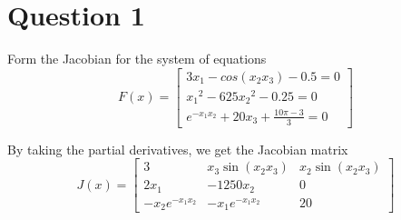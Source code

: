 \section{Question 1}

\begin{question}
    Form the Jacobian for the system of equations 
    \begin{equation}
        F(x) = \left[\begin{matrix}3x_1 − cos(x_2x_3) − 0.5 = 0\\  {x_1}^2 −  625{x_2}^2 − 0.25 = 0\\ e^{−x_1x_2} + 20x_3 + \tfrac{10\pi−3}{3}  = 0\end{matrix}\right]
    \end{equation}
\end{question}

\begin{answer}
    By taking the partial derivatives, we get the Jacobian matrix
    \begin{equation}
        J(x) = 
        \left[\begin{matrix}
            3 & x_3\sin{(x_2x_3)} & x_2\sin{(x_2x_3)}\\
            2x_1 & -1250x_2 & 0\\
            -x_2e^{-x_1x_2} & -x_1e^{-x_1x_2} & 20
        \end{matrix}\right]
    \end{equation}
\end{answer}